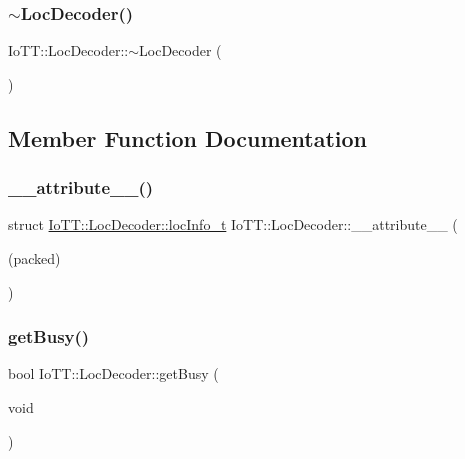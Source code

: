 \subsubsection{\texorpdfstring{$\sim$\+Loc\+Decoder()}{~LocDecoder()}}
{\footnotesize\ttfamily Io\+T\+T\+::\+Loc\+Decoder\+::$\sim$\+Loc\+Decoder (\begin{DoxyParamCaption}{ }\end{DoxyParamCaption})\hspace{0.3cm}{\ttfamily [virtual]}}



\subsection{Member Function Documentation}
\mbox{\label{classIoTT_1_1LocDecoder_ac54f260ecde192daef8f083576e09881}} 
\subsubsection{\texorpdfstring{\+\_\+\+\_\+attribute\+\_\+\+\_\+()}{\_\_attribute\_\_()}}
{\footnotesize\ttfamily struct \hyperlink{structIoTT_1_1LocDecoder_1_1locInfo__t}{Io\+T\+T\+::\+Loc\+Decoder\+::loc\+Info\+\_\+t} Io\+T\+T\+::\+Loc\+Decoder\+::\+\_\+\+\_\+attribute\+\_\+\+\_\+ (\begin{DoxyParamCaption}\item[{(packed)}]{ }\end{DoxyParamCaption})\hspace{0.3cm}{\ttfamily [protected]}}

\mbox{\label{classIoTT_1_1LocDecoder_a16cc784024ab8ba39313f43b3bf9d376}} 
\subsubsection{\texorpdfstring{get\+Busy()}{getBusy()}}
{\footnotesize\ttfamily bool Io\+T\+T\+::\+Loc\+Decoder\+::get\+Busy (\begin{DoxyParamCaption}\item[{void}]{ }\end{DoxyParamCaption})}

